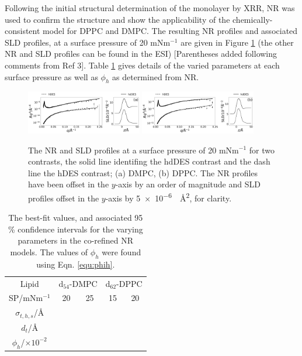 \documentclass[amsmath,amssymb,twocolumn,superscriptaddress]{revtex4-1}
\begin{document}
Following the initial structural determination of the monolayer by XRR, NR was used to confirm the structure and show the applicability of the chemically-consistent model for DPPC and DMPC.
The resulting NR profiles and associated SLD profiles, at a surface pressure of 20 mNm$^{-1}$ are given in Figure \ref{fig:neutron} (the other NR and SLD profiles can be found in the ESI) [Parentheses added following comments from Ref 3].
Table \ref{tab:neutron} gives details of the varied parameters at each surface pressure as well as $\phi_h$ as determined from NR.
%
\begin{figure}
    \centering
  \includegraphics[width=0.45\textwidth]{figures/dmpc_20n_ref_sld}
    \includegraphics[width=0.45\textwidth]{figures/dppc_20n_ref_sld}
    \caption{\small The NR and SLD profiles at a surface pressure of
  20 mNm$^{-1}$ for two contrasts, the solid line identifing the hdDES contrast and the dash line the hDES contrast; (a) DMPC, (b) DPPC. The NR profiles have been offset in the $y$-axis by an order of magnitude and SLD profiles offset in the $y$-axis by \SI{5e-6}{\per\square\angstrom}, for clarity.}
    \label{fig:neutron}
\end{figure}
%
%
\begin{table}
  \caption{\label{tab:neutron} The best-fit values, and associated 95 \%
  confidence intervals for the varying parameters in the co-refined NR models.
  The values of $\phi_h$ were found using Eqn. \ref{equ:phih}.}
  \begin{ruledtabular}
    \begin{tabular*}{\textwidth}{ccccc}
    Lipid & \multicolumn{2}{c}{d$_{54}$-DMPC} & \multicolumn{2}{c}{d$_{62}$-DPPC} \\
    SP/mNm$^{-1}$ & 20 & 25 & 15 & 20 \\
    \hline
    $\sigma_{t,h,s}$/\si{\angstrom} &  &  &  &  \\
    $d_t$/\si{\angstrom} &  &  &  &  \\
    \hline
    $\phi_h$/$\times10^{-2}$ &  &  &  &  \\
    \end{tabular*}
  \end{ruledtabular}
\end{table}
%
\end{document}
